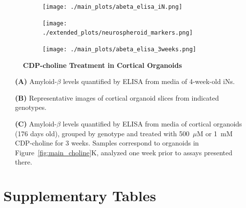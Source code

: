 \documentclass[12pt]{article}
\begin{document}
\begin{figure}[H]
    \begin{subfigure}[t]{0.5\textwidth}
        \caption{}
        \texttt{[image: ./main\_plots/abeta\_elisa\_iN.png]}        
    \end{subfigure}  
    \par
    \begin{subfigure}[t]{0.7\textwidth}
        \caption{}
        \texttt{[image: ./extended\_plots/neurospheroid\_markers.png]}        
    \end{subfigure}
    \par
    \begin{subfigure}[t]{0.7\textwidth}
        \caption{}
        \texttt{[image: ./main\_plots/abeta\_elisa\_3weeks.png]}        
    \end{subfigure}
\caption{
        \textbf{CDP-choline Treatment in Cortical Organoids}\\
    }
    \label{fig:neurospheroid_figure}
\end{figure}
\begin{itemize}
    \item[\textbf{(A)}] Amyloid-$\beta$ levels quantified by ELISA from media of 4-week-old iNs.
    \item[\textbf{(B)}] Representative images of cortical organoid slices from indicated genotypes.
    \item[\textbf{(C)}] Amyloid-$\beta$ levels quantified by ELISA from media of cortical organoids (176 days old), grouped by genotype and treated with 500~$\mu$M or 1~mM CDP-choline for 3 weeks. Samples correspond to organoids in Figure~\ref{fig:main_choline}K, analyzed one week prior to assays presented there.
\end{itemize} \clearpage








 \clearpage

\restoregeometry

\section{Supplementary Tables}
 \label{sec:supplementary_tables}
\captionsetup{justification=raggedright,singlelinecheck=false}
\renewcommand{\thetable}{S\arabic{table}}
\setcounter{table}{0}  
\end{document}
